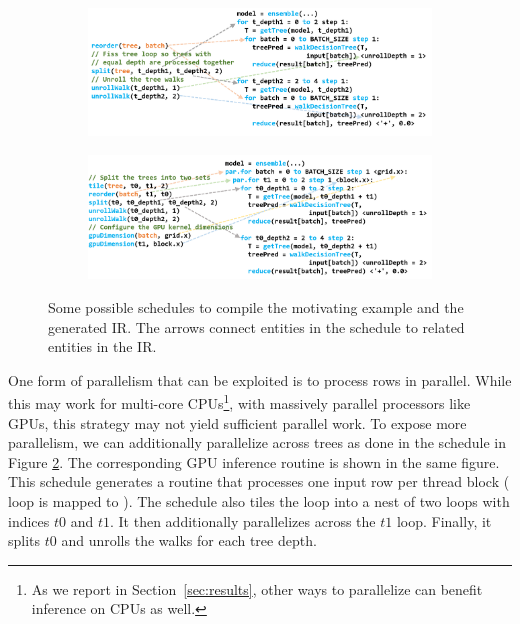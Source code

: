 \begin{figure}[]
  \begin{subfigure}[t]{.5\linewidth}
    \vspace{0pt}
    \centering
    \includegraphics[width=\linewidth]{figures/MotivatingExample1.PNG}
    \caption{\label{fig:schedulea}}
  \end{subfigure}\hfill
  \begin{subfigure}[t]{.5\linewidth}
    \vspace{0pt}
    \centering
    \includegraphics[width=\linewidth]{figures/MotivatingExample2.PNG}
    \caption{\label{fig:scheduleb}}
  \end{subfigure}
  \caption{Some possible schedules to compile the motivating example and the generated \Treebeard{} IR.
  The arrows connect entities in the schedule to related entities in the IR. }
  \label{Fig:Schedules}
\end{figure}

One form of parallelism that can be exploited is to process rows in parallel. 
While this may work for multi-core CPUs\footnote{As we report in Section~\ref{sec:results}, 
other ways to parallelize can benefit inference on CPUs as well.}, with massively parallel processors like GPUs,
 this strategy may not yield sufficient parallel work. To expose more parallelism, 
we can additionally parallelize across trees as done in the schedule in Figure \ref{fig:scheduleb}. 
The corresponding GPU inference routine is shown in the same figure. 
This schedule generates a routine that processes one input row per thread block (
loop is mapped to ). The schedule also tiles the  loop into a
nest of two loops with indices $t0$ and $t1$. It then additionally parallelizes across the $t1$ loop.
Finally, it splits $t0$ and unrolls the walks for each tree depth.

